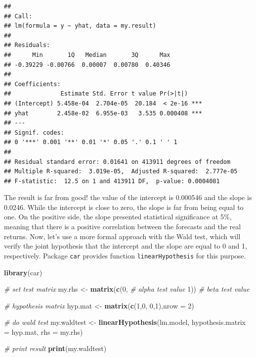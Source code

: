 \documentclass[11pt,]{book}
\newenvironment{Shaded}{\begin{snugshade}}{\end{snugshade}}
\newcommand{\KeywordTok}[1]{\textcolor[rgb]{0.27,0.27,0.27}{\textbf{#1}}}
\newcommand{\DataTypeTok}[1]{\textcolor[rgb]{0.27,0.27,0.27}{#1}}
\newcommand{\DecValTok}[1]{\textcolor[rgb]{0.06,0.06,0.06}{#1}}
\newcommand{\StringTok}[1]{\textcolor[rgb]{0.5,0.5,0.5}{#1}}
\newcommand{\CommentTok}[1]{\textcolor[rgb]{0.56,0.35,0.01}{\textit{#1}}}
\newcommand{\NormalTok}[1]{#1}
\begin{document}
\begin{verbatim}
## 
## Call:
## lm(formula = y ~ yhat, data = my.result)
## 
## Residuals:
##      Min       1Q   Median       3Q      Max 
## -0.39229 -0.00766  0.00007  0.00780  0.40346 
## 
## Coefficients:
##              Estimate Std. Error t value Pr(>|t|)    
## (Intercept) 5.458e-04  2.704e-05  20.184  < 2e-16 ***
## yhat        2.458e-02  6.955e-03   3.535 0.000408 ***
## ---
## Signif. codes:  
## 0 '***' 0.001 '**' 0.01 '*' 0.05 '.' 0.1 ' ' 1
## 
## Residual standard error: 0.01641 on 413911 degrees of freedom
## Multiple R-squared:  3.019e-05,  Adjusted R-squared:  2.777e-05 
## F-statistic:  12.5 on 1 and 413911 DF,  p-value: 0.0004081
\end{verbatim}

The result is far from good! the value of the intercept is 0.000546 and
the slope is 0.0246. While the intercept is close to zero, the slope is
far from being equal to one. On the positive side, the slope presented
statistical significance at 5\%, meaning that there is a positive
correlation between the forecasts and the real returns. Now, let's use a
more formal approach with the Wald test, which will verify the joint
hypothesis that the intercept and the slope are equal to 0 and 1,
respectively. Package \texttt{car} provides function
\texttt{linearHypothesis} for this purpose.

\begin{Shaded}
\begin{Highlighting}[]
\KeywordTok{library}\NormalTok{(car)}

\CommentTok{# set test matrix}
\NormalTok{my.rhs <-}\StringTok{ }\KeywordTok{matrix}\NormalTok{(}\KeywordTok{c}\NormalTok{(}\DecValTok{0}\NormalTok{,   }\CommentTok{# alpha test value}
                   \DecValTok{1}\NormalTok{))  }\CommentTok{# beta test value}

\CommentTok{# hypothesis matrix }
\NormalTok{hyp.mat <-}\StringTok{ }\KeywordTok{matrix}\NormalTok{(}\KeywordTok{c}\NormalTok{(}\DecValTok{1}\NormalTok{,}\DecValTok{0}\NormalTok{,}
                    \DecValTok{0}\NormalTok{,}\DecValTok{1}\NormalTok{),}\DataTypeTok{nrow =} \DecValTok{2}\NormalTok{)}

\CommentTok{# do wald test}
\NormalTok{my.waldtest <-}\StringTok{ }\KeywordTok{linearHypothesis}\NormalTok{(lm.model, }
                                \DataTypeTok{hypothesis.matrix =}\NormalTok{ hyp.mat, }
                                \DataTypeTok{rhs =}\NormalTok{ my.rhs)}

\CommentTok{# print result}
\KeywordTok{print}\NormalTok{(my.waldtest)}
\end{Highlighting}
\end{Shaded}
\end{document}
